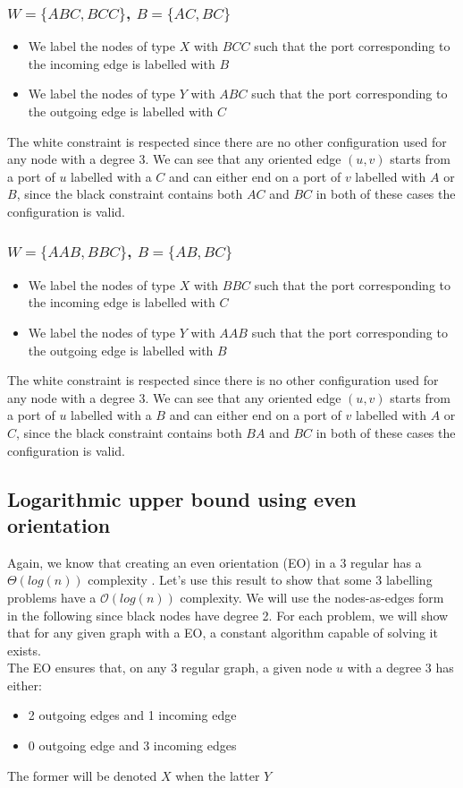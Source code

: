\subsubsection[(W = (ABC, BCC), B = (AC,BC)]{$W = \{ABC, BCC\}$, $B = \{AC, BC\}$}
\begin{itemize}
    \item We label the nodes of type $X$ with $BCC$ such that the port corresponding to the incoming edge is labelled with $B$
    \item We label the nodes of type $Y$ with $ABC$ such that the port corresponding to the outgoing edge is labelled with $C$
\end{itemize}
The white constraint is respected since there are no other configuration used for any node with a degree 3.
We can see that any oriented edge $(u,v)$ starts from a port of $u$ labelled with a $C$ and can either end on a port of $v$ labelled with $A$ or $B$, since the black constraint contains both $AC$ and $BC$ in both of these cases the configuration is valid.
\subsubsection[(W = (AAB, BBC), B = (AB,BC)]{$W = \{AAB, BBC\}$, $B = \{AB, BC\}$}


\begin{itemize}
    \item We label the nodes of type $X$ with $BBC$ such that the port corresponding to the incoming edge is labelled with $C$
    \item We label the nodes of type $Y$ with $AAB$ such that the port corresponding to the outgoing edge is labelled with $B$
\end{itemize}
The white constraint is respected since there is no other configuration used for any node with a degree 3.
We can see that any oriented edge $(u,v)$ starts from a port of $u$ labelled with a $B$ and can either end on a port of $v$ labelled with $A$ or $C$, since the black constraint contains both $BA$ and $BC$ in both of these cases the configuration is valid.



\subsection{Logarithmic upper bound using even orientation}
Again, we know that creating an even orientation (EO) in a 3 regular has a $\Theta(log(n))$ complexity \cite{1}. Let's use this result to show that some 3 labelling problems have a $\mathcal{O}(log(n))$ complexity. We will use the nodes-as-edges form in the following since black nodes have degree 2. For each problem, we will show that for any given graph with a EO, a constant algorithm capable of solving it exists.\\
The EO ensures that, on any 3 regular graph, a given node $u$ with a degree 3 has either:
\begin{itemize}
    \item 2 outgoing edges and 1 incoming edge
    \item 0 outgoing edge and 3 incoming edges
\end{itemize}
The former will be denoted $X$ when the latter $Y$
